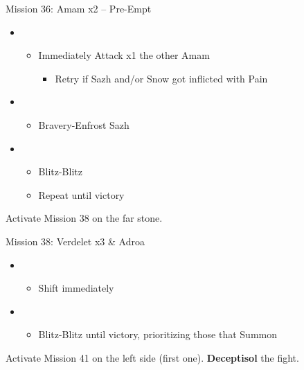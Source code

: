 \begin{battle}{Mission 36: Amam x2 -- Pre-Empt}
	\begin{itemize}
		\item \sixth
			\begin{itemize}
				\item Immediately Attack x1 the other Amam
					\begin{itemize}
						\item Retry if Sazh and/or Snow got inflicted with Pain
					\end{itemize}
			\end{itemize}
		\item \third
			\begin{itemize}
				\item Bravery-Enfrost Sazh
			\end{itemize}
		\item \second
			\begin{itemize}
				\item Blitz-Blitz
				\item Repeat until victory
			\end{itemize}																		
	\end{itemize}
\end{battle}

Activate Mission 38 on the far stone.

\begin{battle}{Mission 38: Verdelet x3 \& Adroa}
	\begin{itemize}
		\item \sixth
			\begin{itemize}
				\item Shift immediately
			\end{itemize}
		\item \first
			\begin{itemize}
				\item Blitz-Blitz until victory, prioritizing those that Summon
			\end{itemize}
	\end{itemize}
\end{battle}

Activate Mission 41 on the left side (first one).
\textbf{Deceptisol} the fight.

